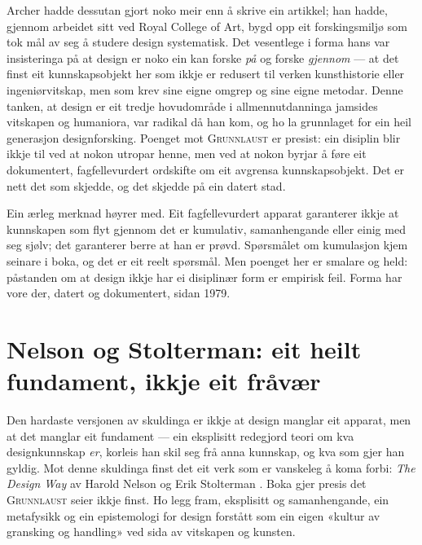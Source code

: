 Archer hadde dessutan gjort noko meir enn å skrive ein artikkel; han hadde, gjennom arbeidet sitt ved Royal College of Art, bygd opp eit forskingsmiljø som tok mål av seg å studere design systematisk. Det vesentlege i forma hans var insisteringa på at design er noko ein kan forske \emph{på} og forske \emph{gjennom} — at det finst eit kunnskapsobjekt her som ikkje er redusert til verken kunsthistorie eller ingeniørvitskap, men som krev sine eigne omgrep og sine eigne metodar. Denne tanken, at design er eit tredje hovudområde i allmennutdanninga jamsides vitskapen og humaniora, var radikal då han kom, og ho la grunnlaget for ein heil generasjon designforsking. Poenget mot \textsc{Grunnlaust} er presist: ein disiplin blir ikkje til ved at nokon utropar henne, men ved at nokon byrjar å føre eit dokumentert, fagfellevurdert ordskifte om eit avgrensa kunnskapsobjekt. Det er nett det som skjedde, og det skjedde på ein datert stad.

Ein ærleg merknad høyrer med. Eit fagfellevurdert apparat garanterer ikkje at kunnskapen som flyt gjennom det er kumulativ, samanhengande eller einig med seg sjølv; det garanterer berre at han er prøvd. Spørsmålet om kumulasjon kjem seinare i boka, og det er eit reelt spørsmål. Men poenget her er smalare og held: påstanden om at design ikkje har ei disiplinær form er empirisk feil. Forma har vore der, datert og dokumentert, sidan 1979.

\section{Nelson og Stolterman: eit heilt fundament, ikkje eit fråvær}

Den hardaste versjonen av skuldinga er ikkje at design manglar eit apparat, men at det manglar eit fundament — ein eksplisitt redegjord teori om kva designkunnskap \emph{er}, korleis han skil seg frå anna kunnskap, og kva som gjer han gyldig. Mot denne skuldinga finst det eit verk som er vanskeleg å koma forbi: \emph{The Design Way} av Harold Nelson og Erik Stolterman \autocite{nelson2012designway}. Boka gjer presis det \textsc{Grunnlaust} seier ikkje finst. Ho legg fram, eksplisitt og samanhengande, ein metafysikk og ein epistemologi for design forstått som ein eigen «kultur av gransking og handling» ved sida av vitskapen og kunsten.

